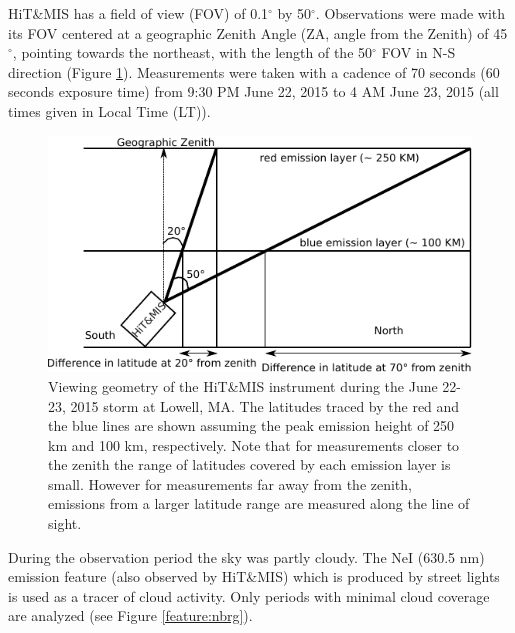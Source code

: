 \documentclass[crop=false,class=mitthesis,oneside,font=12pt]{standalone}
\begin{document}
HiT\&MIS has a field of view (FOV) of 0.1$^\circ$ by 50$^\circ$. Observations were made with its FOV centered at a geographic Zenith Angle (ZA, angle from the Zenith) of 45$^\circ$, pointing towards the northeast, with the length of the 50$^\circ$ FOV in N-S direction (Figure \ref{fig:elayer1}). Measurements were taken with a cadence of
70 seconds (60 seconds exposure time) from 9:30 PM  June 22, 2015 to 4 AM June 23, 2015 (all times given in Local Time (LT)). 
\begin{figure}[H]
	\centering\includegraphics[width=35pc]{elayer.pdf}
	\caption{Viewing geometry of the HiT\&MIS instrument during the June 22-23, 2015 storm at Lowell, MA. The latitudes traced by the red and the blue lines are shown assuming the peak emission height of
		250 km and 100 km, respectively. Note that for measurements closer to the zenith the range of latitudes covered by each emission layer is small. However for measurements far away from the zenith, emissions from a larger latitude range are measured along the line of sight.}
	\label{fig:elayer1}
\end{figure}

During the observation period the sky was partly cloudy. The NeI (630.5 nm) emission feature (also observed by HiT\&MIS) which is produced by street lights is used as a tracer of cloud activity. Only periods with minimal cloud coverage are analyzed (see Figure \ref{feature:nbrg}). 
\end{document}
